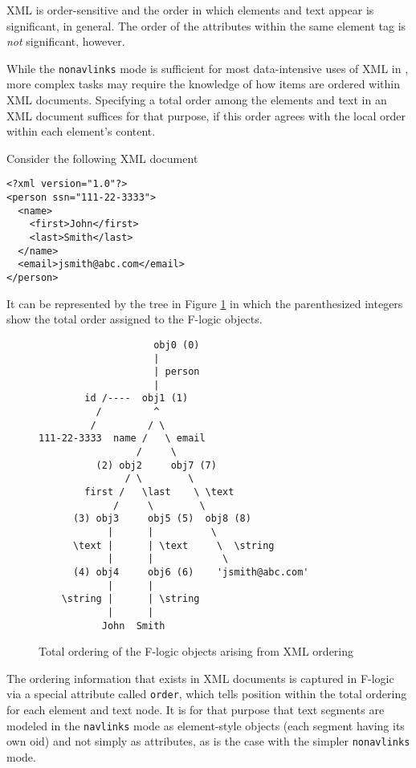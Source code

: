 XML is order-sensitive and the order in which elements and text appear is
significant, in general. The order of the attributes within the same
element tag is \emph{not} significant, however. 

While the \texttt{nonavlinks} mode is sufficient for most data-intensive
uses of XML in \FLSYSTEM, more complex tasks may require the knowledge of
how items are ordered within XML documents. 
Specifying a total order among the elements and text
in an XML document suffices for that purpose, if this order agrees with the
local order within each element's content.

Consider the following XML document
\begin{verbatim}
<?xml version="1.0"?>
<person ssn="111-22-3333">
  <name>
    <first>John</first> 
    <last>Smith</last>
  </name>
  <email>jsmith@abc.com</email>
</person>
\end{verbatim}
It can be represented by the
tree in Figure \ref{fig-total-order}
in which the parenthesized integers 
show the total order assigned to the F-logic objects.

\begin{figure}[bht]
\begin{verbatim}
                    obj0 (0)
                    |
                    | person
                    |
        id /----  obj1 (1)
          /         ^
         /         / \
111-22-3333  name /   \ email
                 /     \
          (2) obj2     obj7 (7)
               / \        \ 
        first /   \last    \ \text
             /     \        \
      (3) obj3     obj5 (5)  obj8 (8)
            |      |          \
      \text |      | \text     \  \string
            |      |            \
      (4) obj4     obj6 (6)    'jsmith@abc.com'
            |      |
    \string |      | \string
            |      |
           John  Smith
\end{verbatim}
  \caption{Total ordering of the F-logic objects arising from XML ordering}
  \label{fig-total-order}
  \end{figure}

The ordering information that exists in XML documents is captured in F-logic
via a special attribute called
{\tt \bs{}order}, which tells position within the total ordering for each
element and text node. It is for that purpose that text segments are
modeled in the \texttt{navlinks} mode as element-style objects (each
segment having its own oid) and not simply as attributes, as is the case
with the simpler \texttt{nonavlinks} mode. 

